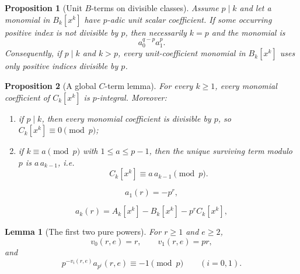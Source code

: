 \documentclass[10pt,a4paper]{amsart}
\newtheorem{lemma}{Lemma}
\newtheorem{proposition}{Proposition}
\begin{document}
\begin{proposition}[Unit $B$-terms on divisible classes]\label{prop:B-unit-divisible}
Assume $p\mid k$ and let a monomial in $B_k[x^k]$ have $p$-adic unit scalar coefficient.  If some occurring positive index is not divisible by $p$, then necessarily $k=p$ and the monomial is
\[
        a_0^{q-p}a_1^p.
\]
Consequently, if $p\mid k$ and $k>p$, every unit-coefficient monomial in $B_k[x^k]$ uses only positive indices divisible by $p$.
\end{proposition}

\begin{proposition}[A global $C$-term lemma]\label{prop:C-global}
For every $k\ge1$, every monomial coefficient of $C_k[x^k]$ is $p$-integral.  Moreover:
\begin{enumerate}[label=\textup{(\roman*)},leftmargin=2.2em]
\item if $p\mid k$, then every monomial coefficient is divisible by $p$, so $C_k[x^k]\equiv0\pmod p$;
\item if $k\equiv a\pmod p$ with $1\le a\le p-1$, then the unique surviving term modulo $p$ is $a\,a_{k-1}$, i.e.
\[
        C_k[x^k]\equiv a\,a_{k-1}\pmod p.
\]
\end{enumerate}
\end{proposition}

\begin{equation}\label{eq:a1-r}
        a_1(r)=-p^r,
\end{equation}

\begin{equation}\label{eq:ABC-r}
        a_k(r)=A_k[x^k]-B_k[x^k]-p^rC_k[x^k],
\end{equation}

\begin{lemma}[The first two pure powers]\label{lem:first-two-pure-pe}
For $r\ge1$ and $e\ge2$,
\[
        v_0(r,e)=r,
        \qquad
        v_1(r,e)=pr,
\]
and
\[
        p^{-v_i(r,e)}a_{p^i}(r,e)\equiv -1\pmod p
        \qquad (i=0,1).
\]
\end{lemma}
\end{document}
